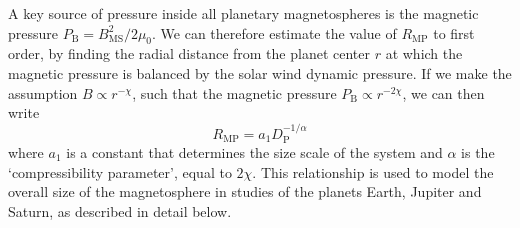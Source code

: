 A key source of pressure inside all planetary magnetospheres is the magnetic pressure $P_\mathrm{B}=B_\mathrm{MS}^2/2\mu_0$. We can therefore estimate the value of $R_\mathrm{MP}$ to first order, by finding the radial distance from the planet center $r$ at which the magnetic pressure is  balanced by the solar wind dynamic pressure. If we make the assumption $B \propto r^{-\chi}$, such that the magnetic pressure $P_\mathrm{B} \propto r^{-2\chi}$, we can then write
\begin{equation}\label{compress:eq:key}
R_\mathrm{MP}=a_1D_\mathrm{P}^{-1/\alpha}
\end{equation}
where $a_1$ is a constant that determines the size scale of the system and $\alpha$ is the `compressibility parameter', equal to $2\chi$. This relationship is used to model the overall size of the magnetosphere in studies of the planets Earth, Jupiter and Saturn, as described in detail below. 


